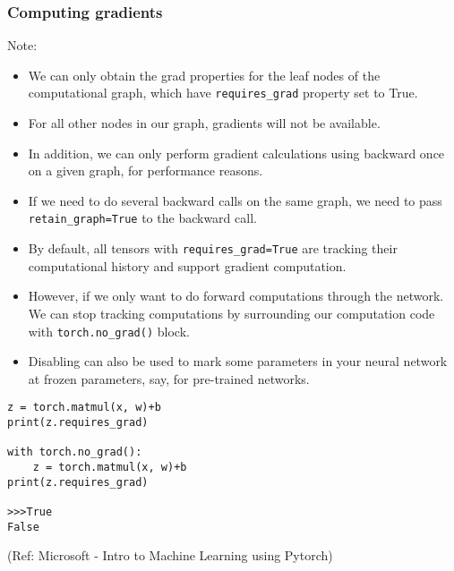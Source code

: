 \begin{frame}[fragile] \frametitle{Computing gradients}

Note:
\begin{itemize}
\item We can only obtain the grad properties for the leaf nodes of the computational graph, which have \lstinline|requires_grad| property set to True. 
\item For all other nodes in our graph, gradients will not be available. 
\item In addition, we can only perform gradient calculations using backward once on a given graph, for performance reasons. 
\item If we need to do several backward calls on the same graph, we need to pass \lstinline|retain_graph=True| to the backward call.
\item By default, all tensors with \lstinline|requires_grad=True| are tracking their computational history and support gradient computation. 
\item However, if we only want to do forward computations through the network. We can stop tracking computations by surrounding our computation code with \lstinline|torch.no_grad()| block.
\item Disabling can also be used to mark some parameters in your neural network at frozen parameters, say, for pre-trained networks.
\end{itemize}

\begin{lstlisting}
z = torch.matmul(x, w)+b
print(z.requires_grad)

with torch.no_grad():
    z = torch.matmul(x, w)+b
print(z.requires_grad)

>>>True
False
\end{lstlisting}

\tiny{(Ref: Microsoft - Intro to Machine Learning using Pytorch)}
\end{frame}


